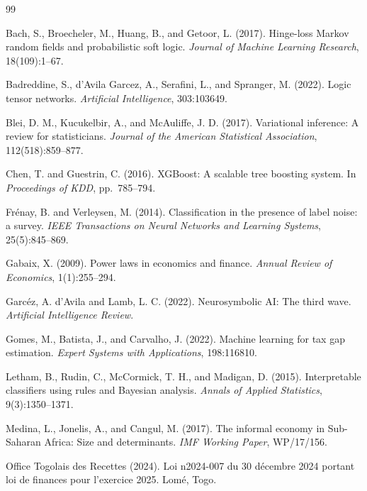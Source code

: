 \documentclass[letterpaper]{article}
\begin{document}
\begin{thebibliography}{99}

Bach, S., Broecheler, M., Huang, B., and Getoor, L. (2017).
Hinge-loss Markov random fields and probabilistic soft logic.
\textit{Journal of Machine Learning Research}, 18(109):1--67.

Badreddine, S., d'Avila Garcez, A., Serafini, L., and Spranger, M. (2022).
Logic tensor networks.
\textit{Artificial Intelligence}, 303:103649.

Blei, D. M., Kucukelbir, A., and McAuliffe, J. D. (2017).
Variational inference: A review for statisticians.
\textit{Journal of the American Statistical Association}, 112(518):859--877.

Chen, T. and Guestrin, C. (2016).
{XGBoost}: A scalable tree boosting system.
In \textit{Proceedings of KDD}, pp.\ 785--794.

Fr{\'e}nay, B. and Verleysen, M. (2014).
Classification in the presence of label noise: a survey.
\textit{IEEE Transactions on Neural Networks and Learning Systems},
25(5):845--869.

Gabaix, X. (2009).
Power laws in economics and finance.
\textit{Annual Review of Economics}, 1(1):255--294.

Garc{\'e}z, A. d'Avila and Lamb, L. C. (2022).
Neurosymbolic AI: The third wave.
\textit{Artificial Intelligence Review}.

Gomes, M., Batista, J., and Carvalho, J. (2022).
Machine learning for tax gap estimation.
\textit{Expert Systems with Applications}, 198:116810.

Letham, B., Rudin, C., McCormick, T. H., and Madigan, D. (2015).
Interpretable classifiers using rules and Bayesian analysis.
\textit{Annals of Applied Statistics}, 9(3):1350--1371.

Medina, L., Jonelis, A., and Cangul, M. (2017).
The informal economy in Sub-Saharan Africa: Size and determinants.
\textit{IMF Working Paper}, WP/17/156.

Office Togolais des Recettes (2024).
Loi n\textdegree{}2024-007 du 30 d\'ecembre 2024 portant loi de finances
pour l'exercice 2025. Lom\'e, Togo.


\end{thebibliography}
\end{document}
